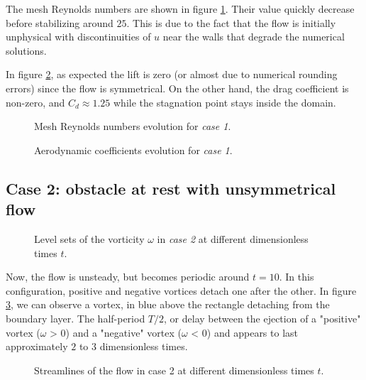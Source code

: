 \documentclass[11 pt]{article}
\begin{document}
The mesh Reynolds numbers are shown in figure \ref{fig:mesh_re_case1}. Their value quickly decrease before stabilizing around $25$. This is due to the fact that the flow is initially unphysical with discontinuities of $u$ near the walls that degrade the numerical solutions.

In figure \ref{fig:drag_case1}, as expected the lift is zero (or almost due to numerical rounding errors) since the flow is symmetrical. On the other hand, the drag coefficient is non-zero, and $C_d \approx 1.25$ while the stagnation point stays inside the domain.

\begin{figure}[H]
    \centering
    
    \caption{Mesh Reynolds numbers evolution for \textit{case 1}.}
    \label{fig:mesh_re_case1}
\end{figure}


\begin{figure}[H]
    \centering
    
    \caption{Aerodynamic coefficients evolution for \textit{case 1}.}
    \label{fig:drag_case1}
\end{figure}




\subsection{Case 2: obstacle at rest with unsymmetrical flow}
\begin{figure}[H]
    \centering
    
    \caption{Level sets of the vorticity $\omega$ in \textit{case 2} at different dimensionless times $t$.}
    \label{fig:vorticity_2}
\end{figure}

Now, the flow is unsteady, but becomes periodic around $t=10$. In this configuration, positive and negative vortices detach one after the other. In figure \ref{fig:vorticity_2}, we can observe a vortex, in blue above the rectangle detaching from the boundary layer. The half-period $T/2$, or delay between the ejection of a "positive" vortex ($\omega$ > 0) and a "negative" vortex ($\omega$ < 0) and  appears to last approximately $2$ to $3$ dimensionless times.

\begin{figure}[H]
    \centering
    
    \caption{Streamlines of the flow in case 2 at different dimensionless times $t$. }
    \label{fig:streamlines_2}
\end{figure}
\end{document}
